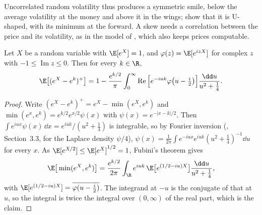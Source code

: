 Uncorrelated random volatility thus produces a symmetric smile, below the average volatility at the
money and above it in the wings; \textcite{renault-touzi-1996} show that it is U-shaped, with its minimum at
the forward. A skew needs a correlation between the price and its volatility, as in the model of
\textcite{heston-closed-form}, which also keeps prices computable.

\begin{lemma}\label{lem:iv-lewis}
Let $X$ be a random variable with $\E[e^X]=1$, and $\varphi(z)=\E[e^{izX}]$ for complex $z$ with
$-1\le\operatorname{Im}z\le0$. Then for every $k\in\R$,
\[
  \E\big[(e^X-e^k)^+\big]=1-\frac{e^{k/2}}\pi\int_0^\infty
  \operatorname{Re}\Big[e^{-iuk}\varphi\big(u-\tfrac i2\big)\Big]\frac{\dd u}{u^2+\frac14}.
\]
\end{lemma}

\begin{proof}
Write $(e^X-e^k)^+=e^X-\min(e^X,e^k)$ and $\min(e^x,e^k)=e^{k/2}e^{x/2}\psi(x)$ with $\psi(x)=e^{-|x-k|/2}$.
Then $\int e^{iux}\psi(x)\,\dd x=e^{iuk}/(u^2+\frac14)$ is integrable, so by Fourier inversion
(\textcite{durrett}, Section~3.3, for the Laplace density $\psi/4$),
$\psi(x)=\frac1{2\pi}\int e^{-iux}e^{iuk}(u^2+\frac14)^{-1}\dd u$ for every $x$. As
$\E[e^{X/2}]\le\E[e^X]^{1/2}=1$, Fubini's theorem gives
\[
  \E\big[\min(e^X,e^k)\big]=\frac{e^{k/2}}{2\pi}\int_\R e^{iuk}\,\E\big[e^{(1/2-iu)X}\big]\frac{\dd u}{u^2+\frac14},
\]
with $\E[e^{(1/2-iu)X}]=\overline{\varphi(u-\frac i2)}$. The integrand at $-u$ is the conjugate of that at
$u$, so the integral is twice the integral over $(0,\infty)$ of the real part, which is the claim.
\end{proof}

